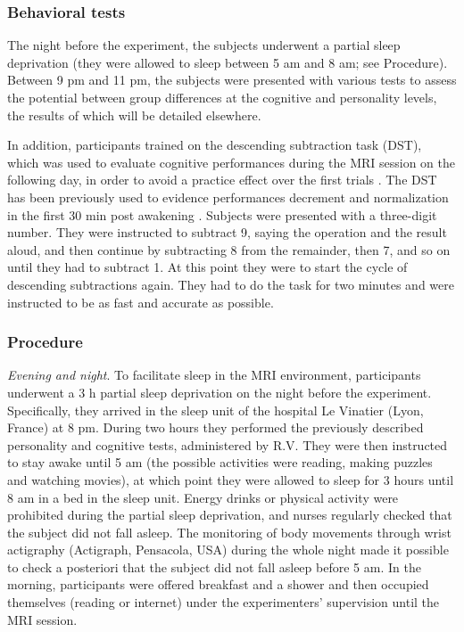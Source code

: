 \subsubsection*{Behavioral tests}
The night before the experiment, the subjects underwent a partial sleep deprivation (they were allowed to sleep between 5 am and 8 am; see Procedure). Between 9 pm and 11 pm, the subjects were presented with various tests to assess the potential between group differences at the cognitive and personality levels, the results of which will be detailed elsewhere.

In addition, participants trained on the descending subtraction task (DST), which was used to evaluate cognitive performances during the MRI session on the following day, in order to avoid a practice effect over the first trials \citep{dinges_assessing_1985}. The DST has been previously used to evidence performances decrement and normalization in the first 30 min post awakening \citep{evans_recovery_1975, dinges_assessing_1985, stampi_ultrashort_1990}. Subjects were presented with a three-digit number. They were instructed to subtract 9, saying the operation and the result aloud, and then continue by subtracting 8 from the remainder, then 7, and so on until they had to subtract 1. At this point they were to start the cycle of descending subtractions again. They had to do the task for two minutes and were instructed to be as fast and accurate as possible.

\subsubsection*{Procedure}
\emph{Evening and night}. To facilitate sleep in the MRI environment, participants underwent a 3 h partial sleep deprivation on the night before the experiment. Specifically, they arrived in the sleep unit of the hospital Le Vinatier (Lyon, France) at 8 pm. During two hours they performed the previously described personality and cognitive tests, administered by R.V. They were then instructed to stay awake until 5 am (the possible activities were reading, making puzzles and watching movies), at which point they were allowed to sleep for 3 hours until 8 am in a bed in the sleep unit. Energy drinks or physical activity were prohibited during the partial sleep deprivation, and nurses regularly checked that the subject did not fall asleep. The monitoring of body movements through wrist actigraphy (Actigraph, Pensacola, USA) during the whole night made it possible to check a posteriori that the subject did not fall asleep before 5 am. In the morning, participants were offered breakfast and a shower and then occupied themselves (reading or internet) under the experimenters’ supervision until the MRI session.


